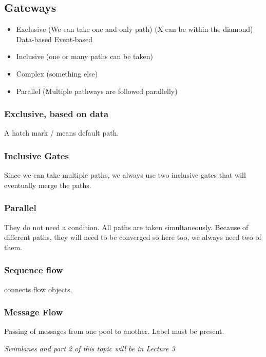 \documentclass{article}
\begin{document}
        \subsection*{Gateways}
            \begin{itemize}
                \item Exclusive (We can take one and only path) (X can be within the diamond)
                    \subitem Data-based
                    \subitem Event-based
                \item Inclusive (one or many paths can be taken)
                \item Complex (something else)
                \item Parallel (Multiple pathways are followed parallelly)
            \end{itemize}
            \subsubsection*{Exclusive, based on data}
                A hatch mark / means default path.
            \subsubsection*{Inclusive Gates}
                Since we can take multiple paths, we always use two inclusive gates that will eventually merge the paths.
            \subsubsection*{Parallel}
                They do not need a condition. All paths are taken simultaneously. Because of different paths, they will need to be converged so here too, we always need two of them.
            \subsubsection*{Sequence flow}
                connects flow objects.
            \subsubsection*{Message Flow}
                Passing of messages from one pool to another. Label must be present.
        
        \emph{Swimlanes and part 2 of this topic will be in Lecture 3}
            
                

                


            

    
\end{document}
